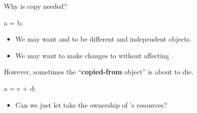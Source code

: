 \begin{frame}[fragile]{Why is copy needed?}
  \begin{cpp}
a = b;
  \end{cpp}
  \begin{itemize}
    \item We may want  and  to be different and independent objects.
    \item We may want to make changes to  without affecting .
  \end{itemize}
  \pause
  However, sometimes the ``\textbf{copied-from} object'' is about to die.
  \begin{cpp}
a = c + d;
  \end{cpp}
  \begin{itemize}
    \item Can we just let  take the ownership of 's resources?
  \end{itemize}
\end{frame}